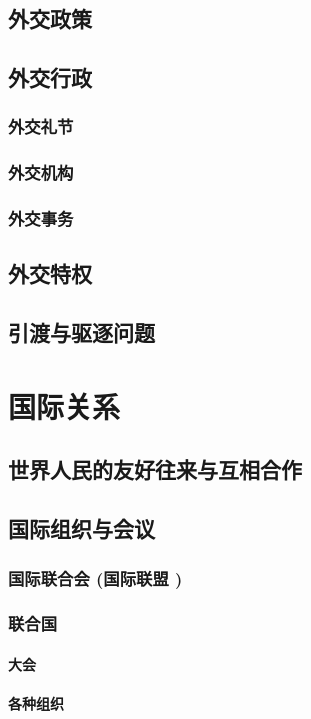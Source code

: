 \documentclass[UTF8]{../RepresentationUniverse}
\begin{document}
    \subsection{外交政策}
    \subsection{外交行政}
        \subsubsection{外交礼节}
        \subsubsection{外交机构}
        \subsubsection{外交事务}
    \subsection{外交特权}
    \subsection{引渡与驱逐问题}


\section{国际关系}
    \subsection{世界人民的友好往来与互相合作}
    \subsection{国际组织与会议}
        \subsubsection{国际联合会 (国际联盟 )}
        \subsubsection{联合国}
            \paragraph{大会}
            \paragraph{各种组织}
\end{document}
